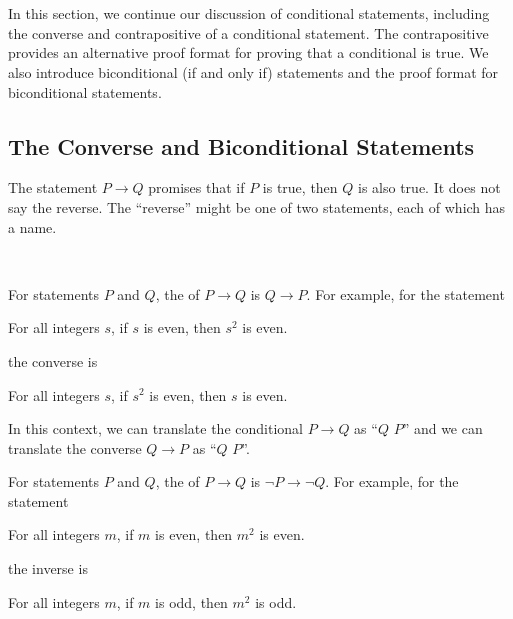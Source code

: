 \section{\secconvcp}
\label{sec_converse_cp}

In this section, we continue our discussion of conditional statements, including the converse and contrapositive of a conditional statement.  The contrapositive provides an alternative proof format for proving that a conditional is true.  We also introduce biconditional (if and only if) statements and the proof format for biconditional statements.  %

\newcommand{\subconv}{The Converse and Biconditional Statements}
\subsection{\subconv}
\label{sub_converse}

The statement $P \to Q$ promises that if $P$ is true, then $Q$ is also true.  It does not say the reverse.  The ``reverse'' might be one of two statements, each of which has a name.

\begin{defn}
\label{defn_converse}
~
    \begin{apart}
        \item For statements $P$ and $Q$, the  of $P \to Q$ is $Q \to P$.  For example, for the statement 
            \begin{center}
                For all integers $s$, if $s$ is even, then $s^2$ is even.
            \end{center}
        the converse is
            \begin{center}
                For all integers $s$, if $s^2$ is even, then $s$ is even.
            \end{center}
        \item In this context, we can translate the conditional $P \to Q$ as ``$Q$  $P$'' and we can translate the converse $Q \to P$ as ``$Q$  $P$''.
            
        \item For statements $P$ and $Q$, the  of $P \to Q$ is $\neg P \to \neg Q$.  For example, for the statement 
            \begin{center}
                For all integers $m$, if $m$ is even, then $m^2$ is even.
            \end{center}
        the inverse is
            \begin{center}
                For all integers $m$, if $m$ is odd, then $m^2$ is odd.
            \end{center}
    \end{apart}
\end{defn}

